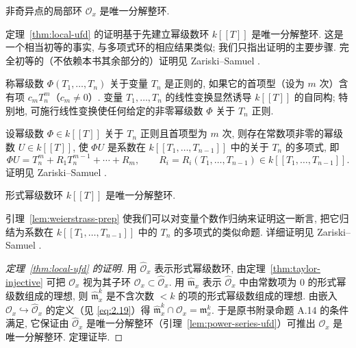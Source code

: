 \begin{theorem}\label{thm:local-ufd}
	非奇异点的局部环 $\mathcal O_x$ 是唯一分解整环.
\end{theorem}

定理~\ref{thm:local-ufd} 的证明基于先建立幂级数环 $k[[T]]$ 是唯一分解整环. 这是一个相当初等的事实, 与多项式环的相应结果类似; 我们只指出证明的主要步骤. 完全初等的（不依赖本书其余部分的）证明见 Zariski--Samuel \cite[第 VII 章第 1 节定理 6]{zariski-samuel1960}.

称幂级数 $\Phi(T_1, \ldots, T_n)$ 关于变量 $T_n$ 是正则的, 如果它的首项型（设为 $m$ 次）含有项 $c_m T_n^m$（$c_m \ne 0$）. 变量 $T_1, \ldots, T_n$ 的线性变换显然诱导 $k[[T]]$ 的自同构; 特别地, 可施行线性变换使任何给定的非零幂级数 $\Phi$ 关于 $T_n$ 正则.

\begin{lemma}\label{lem:weierstrass-prep}
	设幂级数 $\Phi \in k[[T]]$ 关于 $T_n$ 正则且首项型为 $m$ 次, 则存在常数项非零的幂级数 $U \in k[[T]]$, 使 $\Phi U$ 是系数在 $k[[T_1, \ldots, T_{n-1}]]$ 中的关于 $T_n$ 的多项式, 即
	\[
		\Phi U = T_n^m + R_1 T_n^{m-1} + \cdots + R_m, \qquad R_i = R_i(T_1, \ldots, T_{n-1}) \in k[[T_1, \ldots, T_{n-1}]].
	\]
	证明见 Zariski--Samuel \cite[第 VII 章第 1 节定理 5]{zariski-samuel1960}.
\end{lemma}

\begin{lemma}\label{lem:power-series-ufd}
	形式幂级数环 $k[[T]]$ 是唯一分解整环.
\end{lemma}

引理~\ref{lem:weierstrass-prep} 使我们可以对变量个数作归纳来证明这一断言, 把它归结为系数在 $k[[T_1, \ldots, T_{n-1}]]$ 中的 $T_n$ 的多项式的类似命题. 详细证明见 Zariski--Samuel \cite[第 VII 章第 1 节定理 6]{zariski-samuel1960}.

\begin{proof}[定理~\ref{thm:local-ufd} 的证明]
	用 $\widehat{\mathcal O}_x$ 表示形式幂级数环, 由定理~\ref{thm:taylor-injective} 可把 $\mathcal O_x$ 视为其子环 $\mathcal O_x \subset \widehat{\mathcal O}_x$. 用 $\widehat{\mathfrak m}_x$ 表示 $\widehat{\mathcal O}_x$ 中由常数项为 $0$ 的形式幂级数组成的理想, 则 $\widehat{\mathfrak m}_x^k$ 是不含次数 $< k$ 的项的形式幂级数组成的理想. 由嵌入 $\mathcal O_x \hookrightarrow \widehat{\mathcal O}_x$ 的定义（见 \eqref{eq:2.19}）得 $\widehat{\mathfrak m}_x^k \cap \mathcal O_x = \mathfrak m_x^k$. 于是原书附录命题 A.14 的条件满足, 它保证由 $\widehat{\mathcal O}_x$ 是唯一分解整环（引理~\ref{lem:power-series-ufd}）可推出 $\mathcal O_x$ 是唯一分解整环. 定理证毕.
\end{proof}

